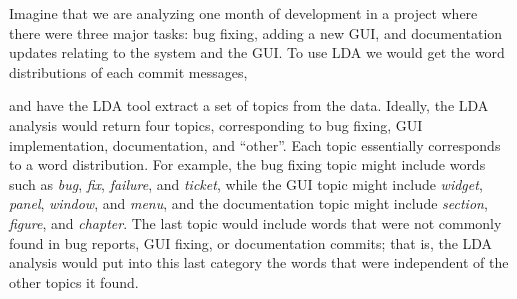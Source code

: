 \documentclass[times, 10pt,twocolumn]{article}
\begin{document}
Imagine that we are analyzing one month of development in a project
where there were three major tasks: bug fixing, adding a new GUI, and
documentation updates relating to the system and the GUI. To use LDA
we would get the word distributions of each commit messages, 

and have the LDA tool extract a set of topics from the data.  Ideally,
the LDA analysis would return four topics, corresponding to bug
fixing, GUI implementation, documentation, and ``other''.  Each topic
essentially corresponds to a word distribution.  For example, the bug
fixing topic might include words such as \emph{bug}, \emph{fix}, \emph{failure}, and
\emph{ticket}, while the GUI topic might include \emph{widget}, \emph{panel}, \emph{window}, and
\emph{menu}, and the documentation topic might include \emph{section}, \emph{figure}, and
\emph{chapter}.  The last topic would include words that were not commonly
found in bug reports, GUI fixing, or documentation commits; that is,
the LDA analysis would put into this last category the words that were
independent of the other topics it found.
\end{document}
